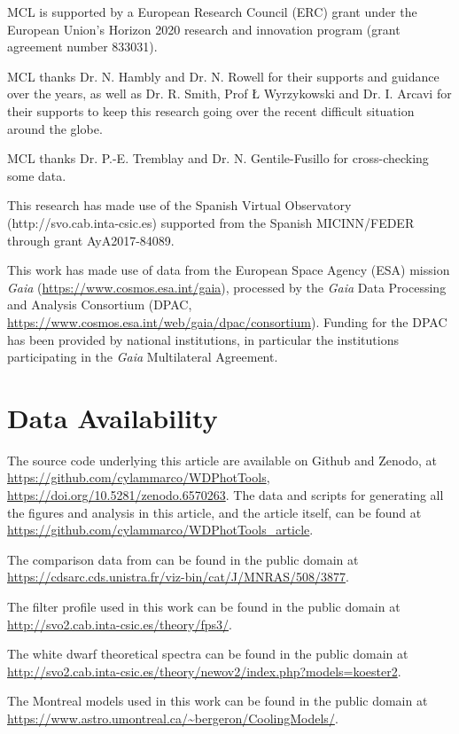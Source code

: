 \documentclass[fleqn,usenatbib]{rasti}
\begin{document}
MCL is supported by a European Research Council (ERC) grant under the European
Union’s Horizon 2020 research and innovation program (grant agreement number
833031).

MCL thanks Dr. N. Hambly and Dr. N. Rowell for their supports and guidance over
the years, as well as Dr. R. Smith, Prof \L{} Wyrzykowski and Dr. I. Arcavi
for their supports to keep this research going over the recent difficult
situation around the globe.

MCL thanks Dr. P.-E. Tremblay and Dr. N. Gentile-Fusillo for cross-checking
some data.

This research has made use of the Spanish Virtual Observatory
(http://svo.cab.inta-csic.es) supported from the Spanish MICINN/FEDER through
grant AyA2017-84089.

This work has made use of data from the European Space Agency (ESA) mission
{\it Gaia} (\url{https://www.cosmos.esa.int/gaia}), processed by the {\it Gaia}
Data Processing and Analysis Consortium (DPAC,
\url{https://www.cosmos.esa.int/web/gaia/dpac/consortium}). Funding for the DPAC
has been provided by national institutions, in particular the institutions
participating in the {\it Gaia} Multilateral Agreement.

\section*{Data Availability}
The source code underlying this article are available on Github and Zenodo, at \url{https://github.com/cylammarco/WDPhotTools}, \url{https://doi.org/10.5281/zenodo.6570263}. The data and scripts for generating all the figures and analysis in this article, and the article itself, can be found at \url{https://github.com/cylammarco/WDPhotTools_article}.

The comparison data from \citet{2021MNRAS.508.3877G} can be found in the public domain at \url{https://cdsarc.cds.unistra.fr/viz-bin/cat/J/MNRAS/508/3877}.

The filter profile used in this work can be found in the public domain at \url{http://svo2.cab.inta-csic.es/theory/fps3/}.

The white dwarf theoretical spectra can be found in the public domain at \url{http://svo2.cab.inta-csic.es/theory/newov2/index.php?models=koester2}.

The Montreal models used in this work can be found in the public domain at \url{https://www.astro.umontreal.ca/~bergeron/CoolingModels/}.
\end{document}

